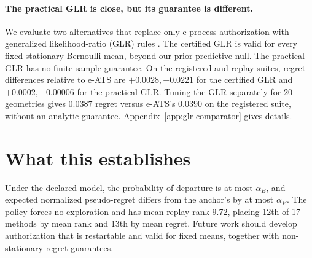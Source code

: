 \documentclass{article}
\newcommand{\method}{e-ATS}
\newcommand{\1}{\mathbf 1}
\begin{document}
\paragraph{The practical GLR is close, but its guarantee is different.}
We evaluate two alternatives that replace only e-process authorization
with generalized likelihood-ratio (GLR) rules \citep{besson2022glr}.
The certified GLR is valid for every fixed stationary Bernoulli mean,
beyond our prior-predictive null.
The practical GLR has no finite-sample guarantee.
On the registered and replay suites, regret differences relative
to \method{} are $+0.0028,+0.0221$ for the certified GLR
and $+0.0002,-0.00006$ for the practical GLR.
Tuning the GLR separately for 20 geometries
gives $0.0387$ regret versus \method{}’s $0.0390$ on the
registered suite, without an analytic guarantee.
Appendix~\ref{app:glr-comparator} gives details.

\section{What this establishes}

Under the declared model, the probability of departure is at most $\alpha_E$,
and expected normalized pseudo-regret differs from the anchor’s by at
most $\alpha_E$.
The policy forces no exploration and has mean replay rank 9.72,
placing 12th of 17 methods by mean rank and 13th by mean regret.
Future work should develop authorization that is restartable and valid for
fixed means, together with non-stationary regret guarantees.

\newpage



\newpage
\appendix
\raggedbottom

\end{document}

